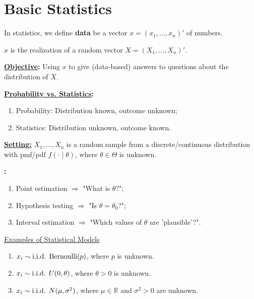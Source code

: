 \documentclass[11pt]{elegantbook}
\begin{document}
\section{Basic Statistics}
In statistics, we define \textbf{data} be a vector $x=(x_1,...,x_n)'$ of numbers.
\begin{assumption}
    $x$ is the realization of a random vector $X=(X_1,...,X_n)'$.
\end{assumption}

\textbf{\underline{Objective}:} Using $x$ to give (data-based) answers to questions about the distribution of $X$.

\textbf{\underline{Probability vs. Statistics}:}
\begin{enumerate}[$\circ$]
    \item Probability: Distribution known, outcome unknown;
    \item Statistics: Distribution unknown, outcome known.
\end{enumerate}

\textbf{\underline{Setting:}} $X_1,...,X_n$ is a random sample from a discrete/continuous distribution with pmf/pdf $f(\cdot\mid \theta)$, where $\theta\in\Theta$ is unknown.

\textbf{:}
\begin{enumerate}[$\circ$]
    \item Point estimation $\Rightarrow$ "What is $\theta$?";
    \item Hypothesis testing $\Rightarrow$ "Is $\theta=\theta_0$?";
    \item Interval estimation $\Rightarrow$ "Which values of $\theta$ are 'plausible'?".
\end{enumerate}

\begin{example}
    \underline{Examples of Statistical Models}
    \begin{enumerate}[(1).]
        \item $x_i\sim \textnormal{i.i.d. } \textnormal{Bernoulli}(p)$, where $p$ is unknown.
        \item $x_i\sim \textnormal{i.i.d. } U(0,\theta)$, where $\theta>0$ is unknown.
        \item $x_i\sim \textnormal{i.i.d. } N(\mu,\sigma^2)$, where $\mu\in \mathbb{R}$ and $\sigma^2>0$ are unknown.
    \end{enumerate}
\end{example}
\end{document}
